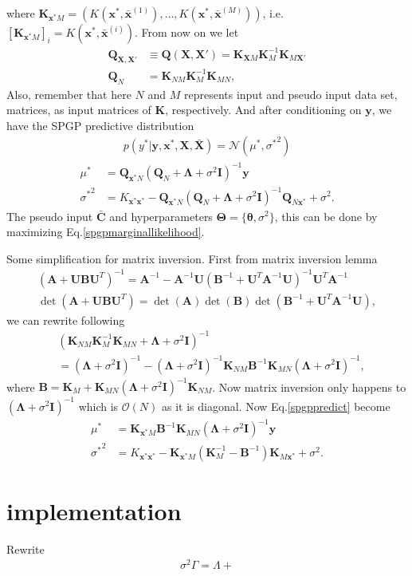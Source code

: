 \documentclass[10pt,a4paper]{article}
\begin{document}
where $\pmb{K}_{\pmb{x}^*M}=(K(\pmb{x}^*,\bar{\pmb{x}}^{(1)}),\dots,K(\pmb{x}^*,\bar{\pmb{x}}^{(M)}))$, i.e. $[\pmb{K}_{\pmb{x}^*M}]_{i}=K(\pmb{x}^*,\bar{\pmb{x}}^{(i)})$. From now on we let 
\begin{align}
\pmb{Q}_{\pmb{X},\pmb{X}'}&\equiv\pmb{Q}(\pmb{X},\pmb{X}')=\pmb{K}_{\pmb{X}M}\pmb{K}_{M}^{-1}\pmb{K}_{M\pmb{X}'}\\
\pmb{Q}_N&=\pmb{K}_{NM}\pmb{K}_{M}^{-1}\pmb{K}_{MN},
\end{align}
Also, remember that here $N$ and $M$ represents input and pseudo input data set, matrices, as input matrices of $\pmb{K}$, respectively.
And after conditioning on $\pmb{y}$, we have the SPGP predictive distribution
\begin{align}
p(y^*|\pmb{y},\pmb{x}^*,\pmb{X},\bar{\pmb{X}})=\mathcal{N}(\mu^*,{\sigma^*}^2)
\end{align}
\begin{equation}
\begin{aligned}
\mu^*&=\pmb{Q}_{\pmb{x}^*N}(\pmb{Q}_N+\pmb{\Lambda}+\sigma^2\pmb{I})^{-1}\pmb{y}\\
{\sigma^*}^2&=K_{\pmb{x}^*\pmb{x}^*}-\pmb{Q}_{\pmb{x}^*N}(\pmb{Q}_N+\pmb{\Lambda}+\sigma^2\pmb{I})^{-1}\pmb{Q}_{N\pmb{x}^*}+\sigma^2.
\end{aligned}
\label{spgppredict}
\end{equation}
The pseudo input $\bar{\pmb{C}}$ and hyperparameters $\pmb{\Theta}=\lbrace\pmb{\theta},\sigma^2\rbrace$, this can be done by maximizing Eq.\ref{spgpmarginallikelihood}.

Some simplification for matrix inversion. First from matrix inversion lemma
\begin{align}
(\pmb{A}+\pmb{U}\pmb{B}\pmb{U}^T)^{-1}=\pmb{A}^{-1}-\pmb{A}^{-1}\pmb{U}(\pmb{B}^{-1}+\pmb{U}^T\pmb{A}^{-1}\pmb{U})^{-1}\pmb{U}^T\pmb{A}^{-1}\\
\det(\pmb{A}+\pmb{U}\pmb{B}\pmb{U}^T)=\det(\pmb{A})\det(\pmb{B})\det(\pmb{B}^{-1}+\pmb{U}^T\pmb{A}^{-1}\pmb{U}),
\end{align}
we can rewrite following
\begin{align}
&(\pmb{K}_{NM}\pmb{K}_{M}^{-1}\pmb{K}_{MN}+\pmb{\Lambda}+\sigma^2\pmb{I})^{-1}\\
&=(\pmb{\Lambda}+\sigma^2\pmb{I})^{-1}-(\pmb{\Lambda}+\sigma^2\pmb{I})^{-1}\pmb{K}_{NM}\pmb{B}^{-1}\pmb{K}_{MN}(\pmb{\Lambda}+\sigma^2\pmb{I})^{-1},
\end{align}
where $\pmb{B}=\pmb{K}_M+\pmb{K}_{MN}(\pmb{\Lambda}+\sigma^2\pmb{I})^{-1}\pmb{K}_{NM}$. Now matrix inversion only happens to $(\pmb{\Lambda}+\sigma^2\pmb{I})^{-1}$ which is $\mathcal{O}(N)$ as it is diagonal. Now Eq.\ref{spgppredict} become
\begin{equation}
\begin{aligned}
\mu^*&=\pmb{K}_{\pmb{x}^*M}\pmb{B}^{-1}\pmb{K}_{MN}(\pmb{\Lambda}+\sigma^2\pmb{I})^{-1}\pmb{y}\\
{\sigma^*}^2&=K_{\pmb{x}^*\pmb{x}^*}-\pmb{K}_{\pmb{x}^*M}(\pmb{K}_M^{-1}-\pmb{B}^{-1})\pmb{K}_{M\pmb{x}^*}+\sigma^2.
\end{aligned}
\label{spgppredictsim}
\end{equation}
\section{implementation}
Rewrite
\begin{align}
\sigma^2\Gamma=\Lambda+
\end{align}
\end{document}
